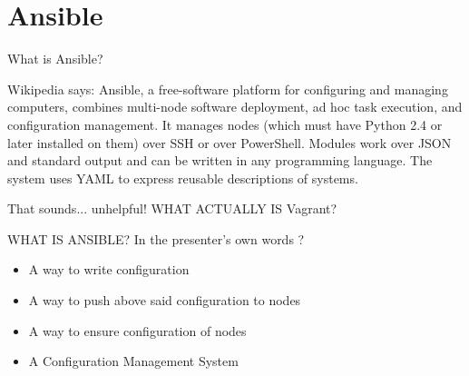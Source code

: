 \documentclass{beamer}
\begin{document}
\section{Ansible}
    \begin{frame}{What is Ansible?}
    \begin{block}{Wikipedia says:}
	    Ansible, a free-software platform for configuring and managing computers, combines multi-node software deployment,
	    ad hoc task execution, and configuration management. It manages nodes (which must have Python 2.4 or later installed on them)
	    over SSH or over PowerShell. Modules work over JSON and standard output and can be written in any programming language.
	    The system uses YAML to express reusable descriptions of systems.
    \end{block}
    \pause That sounds... unhelpful! WHAT ACTUALLY IS Vagrant?
    \end{frame}

    \begin{frame}{WHAT IS ANSIBLE?}
	    In the presenter's own words ?
        \begin{itemize}
	    \pause \item A way to write configuration
	    \pause \item A way to push above said configuration to nodes
	    \pause \item A way to ensure configuration of nodes
	    \pause \item A Configuration Management System
        \end{itemize}
    \end{frame}

%        
\end{document}
